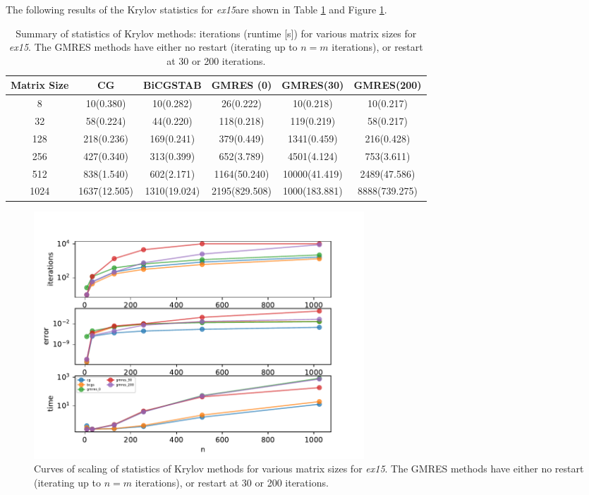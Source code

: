 \documentclass[12pt,letterpaper]{article}
\newcommand{\program}{\textit{ex15}}
\begin{document}
The following results of the Krylov statistics for \program are shown in Table \ref{tab:Ex2} and Figure \ref{fig:Ex2}.

\begin{table}[htb!]
    \centering
    \caption{Summary of statistics of Krylov methods: iterations (runtime [s]) for various matrix sizes for \program. The GMRES methods have either no restart (iterating up to $n=m$ iterations), or restart at 30 or 200 iterations.}
    \label{tab:Ex2}
    \begin{tabular}{|c|c|c|c|c|c|} \hline
        Matrix Size & CG & BiCGSTAB & GMRES (0) & GMRES(30) & GMRES(200) \\ \hline
        8 &       10(0.380) &  10(0.282) &   26(0.222) &    10(0.218)  &    10(0.217) \\ \hline
        32    &  58(0.224)  & 44(0.220)   & 118(0.218)    & 119(0.219)    &  58(0.217) \\ \hline
        128   &  218(0.236)  & 169(0.241)   & 379(0.449)    & 1341(0.459)    &  216(0.428) \\ \hline
        256   &  427(0.340)  & 313(0.399)  &  652(3.789)    & 4501(4.124)    &  753(3.611) \\ \hline
        512   &  838(1.540)  & 602(2.171)  & 1164(50.240)   & 10000(41.419)    & 2489(47.586) \\ \hline
        1024 &  1637(12.505)  & 1310(19.024) & 2195(829.508)  & 1000(183.881)    & 8888(739.275) \\ \hline
    \end{tabular}
\end{table}


\begin{figure}[ht]
  \centering
  \includegraphics[width=0.6\textwidth,trim={0 0 0 0cm},clip]{results_nocondition.pdf}
  \caption{Curves of scaling of statistics of Krylov methods for various matrix sizes for \program. The GMRES methods have either no restart (iterating up to $n=m$ iterations), or restart at 30 or 200 iterations.}
  \label{fig:Ex2}
\end{figure}
\end{document}
